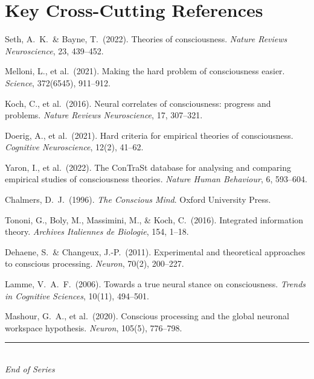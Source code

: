 \documentclass[11pt,a4paper]{report}
\begin{document}
\section*{Key Cross-Cutting References}
\begin{enumerate}[label={[\arabic*]}, leftmargin=2.5em]
  \item Seth, A.\ K.\ \& Bayne, T.\ (2022). Theories of consciousness. \textit{Nature Reviews Neuroscience}, 23, 439--452.
  \item Melloni, L., et al.\ (2021). Making the hard problem of consciousness easier. \textit{Science}, 372(6545), 911--912.
  \item Koch, C., et al.\ (2016). Neural correlates of consciousness: progress and problems. \textit{Nature Reviews Neuroscience}, 17, 307--321.
  \item Doerig, A., et al.\ (2021). Hard criteria for empirical theories of consciousness. \textit{Cognitive Neuroscience}, 12(2), 41--62.
  \item Yaron, I., et al.\ (2022). The ConTraSt database for analysing and comparing empirical studies of consciousness theories. \textit{Nature Human Behaviour}, 6, 593--604.
  \item Chalmers, D.\ J.\ (1996). \textit{The Conscious Mind}. Oxford University Press.
  \item Tononi, G., Boly, M., Massimini, M., \& Koch, C.\ (2016). Integrated information theory. \textit{Archives Italiennes de Biologie}, 154, 1--18.
  \item Dehaene, S.\ \& Changeux, J.-P.\ (2011). Experimental and theoretical approaches to conscious processing. \textit{Neuron}, 70(2), 200--227.
  \item Lamme, V.\ A.\ F.\ (2006). Towards a true neural stance on consciousness. \textit{Trends in Cognitive Sciences}, 10(11), 494--501.
  \item Mashour, G.\ A., et al.\ (2020). Conscious processing and the global neuronal workspace hypothesis. \textit{Neuron}, 105(5), 776--798.
\end{enumerate}

\vfill
\begin{center}
  {\color{gray}\rule{0.4\textwidth}{0.5pt}}\\[8pt]
  {\small\color{gray}\itshape End of Series}
\end{center}
\end{document}
